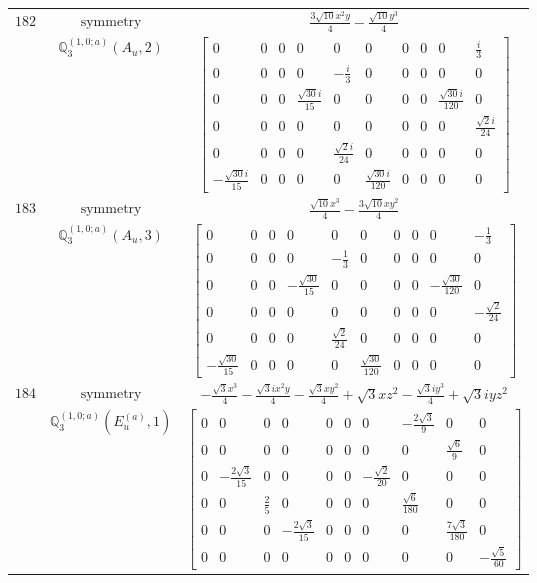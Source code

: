 \documentclass[fleqn,8pt,landscape]{jsarticle}
\begin{document}
\begin{longtable}{ccc}
$ 182 $ & $ \text{symmetry} $ & $ \frac{3 \sqrt{10} x^{2} y}{4} - \frac{\sqrt{10} y^{3}}{4} $ \\
$  $ & $ \mathbb{Q}_{3}^{(1,0;a)}(A_{u},2) $ & $ \begin{bmatrix} 0 & 0 & 0 & 0 & 0 & 0 & 0 & 0 & 0 & \frac{i}{3} \\ 0 & 0 & 0 & 0 & - \frac{i}{3} & 0 & 0 & 0 & 0 & 0 \\ 0 & 0 & 0 & \frac{\sqrt{30} i}{15} & 0 & 0 & 0 & 0 & \frac{\sqrt{30} i}{120} & 0 \\ 0 & 0 & 0 & 0 & 0 & 0 & 0 & 0 & 0 & \frac{\sqrt{2} i}{24} \\ 0 & 0 & 0 & 0 & \frac{\sqrt{2} i}{24} & 0 & 0 & 0 & 0 & 0 \\ - \frac{\sqrt{30} i}{15} & 0 & 0 & 0 & 0 & \frac{\sqrt{30} i}{120} & 0 & 0 & 0 & 0 \end{bmatrix} $ \\ \hline
$ 183 $ & $ \text{symmetry} $ & $ \frac{\sqrt{10} x^{3}}{4} - \frac{3 \sqrt{10} x y^{2}}{4} $ \\
$  $ & $ \mathbb{Q}_{3}^{(1,0;a)}(A_{u},3) $ & $ \begin{bmatrix} 0 & 0 & 0 & 0 & 0 & 0 & 0 & 0 & 0 & - \frac{1}{3} \\ 0 & 0 & 0 & 0 & - \frac{1}{3} & 0 & 0 & 0 & 0 & 0 \\ 0 & 0 & 0 & - \frac{\sqrt{30}}{15} & 0 & 0 & 0 & 0 & - \frac{\sqrt{30}}{120} & 0 \\ 0 & 0 & 0 & 0 & 0 & 0 & 0 & 0 & 0 & - \frac{\sqrt{2}}{24} \\ 0 & 0 & 0 & 0 & \frac{\sqrt{2}}{24} & 0 & 0 & 0 & 0 & 0 \\ - \frac{\sqrt{30}}{15} & 0 & 0 & 0 & 0 & \frac{\sqrt{30}}{120} & 0 & 0 & 0 & 0 \end{bmatrix} $ \\ \hline
$ 184 $ & $ \text{symmetry} $ & $ - \frac{\sqrt{3} x^{3}}{4} - \frac{\sqrt{3} i x^{2} y}{4} - \frac{\sqrt{3} x y^{2}}{4} + \sqrt{3} x z^{2} - \frac{\sqrt{3} i y^{3}}{4} + \sqrt{3} i y z^{2} $ \\
$  $ & $ \mathbb{Q}_{3}^{(1,0;a)}(E_{u}^{(a)},1) $ & $ \begin{bmatrix} 0 & 0 & 0 & 0 & 0 & 0 & 0 & - \frac{2 \sqrt{3}}{9} & 0 & 0 \\ 0 & 0 & 0 & 0 & 0 & 0 & 0 & 0 & \frac{\sqrt{6}}{9} & 0 \\ 0 & - \frac{2 \sqrt{3}}{15} & 0 & 0 & 0 & 0 & - \frac{\sqrt{2}}{20} & 0 & 0 & 0 \\ 0 & 0 & \frac{2}{5} & 0 & 0 & 0 & 0 & \frac{\sqrt{6}}{180} & 0 & 0 \\ 0 & 0 & 0 & - \frac{2 \sqrt{3}}{15} & 0 & 0 & 0 & 0 & \frac{7 \sqrt{3}}{180} & 0 \\ 0 & 0 & 0 & 0 & 0 & 0 & 0 & 0 & 0 & - \frac{\sqrt{5}}{60} \end{bmatrix} $ \\ \hline

\end{longtable}
\end{document}
